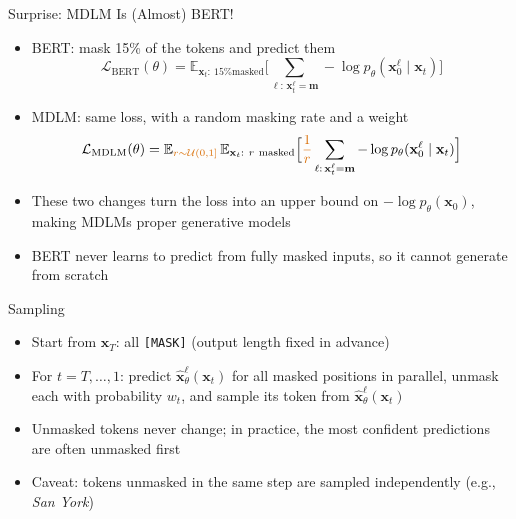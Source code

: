 \documentclass[11pt,compress,t,notes=noshow, xcolor=table]{beamer}
\providecommand{\bx}{\mathbf{x}}
\begin{document}
\begin{frame}{Surprise: MDLM Is (Almost) BERT!}
 
 
\vfill
 
\begin{itemize}
\item BERT: mask 15\% of the tokens and predict them 
\begin{equation*}
\mathcal{L}_{\text{BERT}}(\theta) = \mathbb{E}_{\bx_t:\ \text{15\% masked}}\Big[\sum_{\ell:\, \bx_t^\ell = \mathbf{m}} -\log p_\theta(\bx_0^\ell \mid \bx_t)\Big]
\end{equation*}
\item<2-> MDLM: same loss, with a \textcolor{hl}{random masking rate} and a \textcolor{hl}{weight}
\begin{equation*}
\mathcal{L}_{\text{MDLM}}(\theta) = \mathbb{E}_{\textcolor{hl}{r \sim \mathcal{U}(0, 1]}}\, \mathbb{E}_{\bx_t:\ r\ \text{masked}}\Big[\textcolor{hl}{\frac{1}{r}} \sum_{\ell:\, \bx_t^\ell = \mathbf{m}} -\log p_\theta(\bx_0^\ell \mid \bx_t)\Big]
\end{equation*}
\item<3-> These two changes turn the loss into an upper bound on $-\log p_\theta(\bx_0)$, making MDLMs  proper generative models
\item<3-> BERT never learns to predict from fully masked inputs, so it cannot generate from scratch
\end{itemize}
 
\vfill
 
\end{frame}
 
 
 
 \begin{frame}{Sampling}
 
\vfill
 
\begin{itemize}
\item Start from $\bx_T$: all \texttt{[MASK]} (output length fixed in advance)
\item For $t = T, \dots, 1$: predict $\hat{\bx}_\theta^\ell(\bx_t)$ for all masked positions in parallel, unmask each with probability $w_t$, and sample its token from $\hat{\bx}_\theta^\ell(\bx_t)$
\item Unmasked tokens never change; in practice, the most confident predictions are often unmasked first 
\item Caveat: tokens unmasked in the same step are sampled independently (e.g., \textit{San York})
\end{itemize}
 
\vfill
 
\end{frame}
\end{document}
